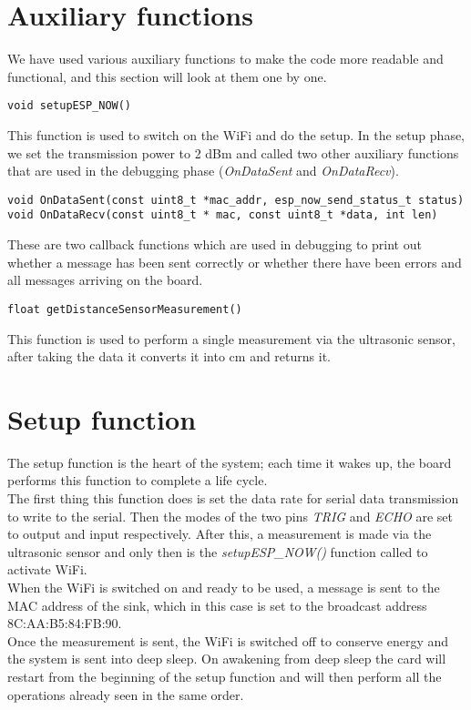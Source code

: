 \section{Auxiliary functions}
We have used various auxiliary functions to make the code more readable and functional, and this section will look at them one by one. \\
\begin{verbatim}
void setupESP_NOW()
\end{verbatim}
This function is used to switch on the WiFi and do the setup.
In the setup phase, we set the transmission power to 2 dBm and called two other auxiliary functions that are used in the debugging phase (\textit{OnDataSent} and  \textit{OnDataRecv}). \\
\begin{verbatim}
void OnDataSent(const uint8_t *mac_addr, esp_now_send_status_t status)
void OnDataRecv(const uint8_t * mac, const uint8_t *data, int len) 
\end{verbatim}
These are two callback functions which are used in debugging to print out whether a message has been sent correctly or whether there have been errors and all messages arriving on the board. \\
\begin{verbatim}
float getDistanceSensorMeasurement()
\end{verbatim}
This function is used to perform a single measurement via the ultrasonic sensor, after taking the data it converts it into cm and returns it.

\section{Setup function}
The setup function is the heart of the system; each time it wakes up, the board performs this function to complete a life cycle.\\
The first thing this function does is set the data rate for serial data transmission to write to the serial.
Then the modes of the two pins  \textit{TRIG} and  \textit{ECHO} are set to output and input respectively.
After this, a measurement is made via the ultrasonic sensor and only then is the  \textit{setupESP\_NOW()} function called to activate WiFi.\\
When the WiFi is switched on and ready to be used, a message is sent to the MAC address of the sink, which in this case is set to the broadcast address 8C:AA:B5:84:FB:90.\\
Once the measurement is sent, the WiFi is switched off to conserve energy and the system is sent into deep sleep.
On awakening from deep sleep the card will restart from the beginning of the setup function and will then perform all the operations already seen in the same order.








